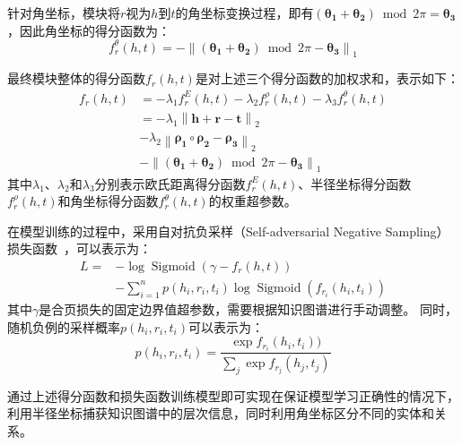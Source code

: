 \documentclass[algorithmlist, AutoFakeBold, AutoFakeSlant, figurelist, tablelist, nomlist, engineering]{seuthesix}
\begin{document}
针对角坐标，模块将$r$视为$h$到$t$的角坐标变换过程，即有$(\bm{\theta_1} + \bm{\theta_2}) \bmod 2 \pi = \bm{\theta_3}$，因此角坐标的得分函数为：
\begin{equation}
  f^{\theta}_r\left(h, t\right) =-\left\|\left(\bm{\theta_1}+\bm{\theta_2}\right) \bmod 2 \pi - \bm{\theta_3}\right\|_1
\end{equation}

最终模块整体的得分函数$f_r(h, t)$是对上述三个得分函数的加权求和，表示如下：
\begin{equation}
  \begin{aligned}
    f_r\left(h, t\right) &= -\lambda_1 f^{E}_r(h, t) -\lambda_2 f^{\rho}_r(h, t) -\lambda_3 f^{\theta}_r(h, t) \\
    &= -\lambda_1 \left\|\bm{h} + \bm{r} - \bm{t}\right\|_2 \\
    &-\lambda_2 \left\|\bm{\rho_1} \circ \bm{\rho_2} - \bm{\rho_3}\right\|_2 \\
    &-\left\|\left(\bm{\theta_1}+\bm{\theta_2}\right) \bmod 2 \pi - \bm{\theta_3}\right\|_1
  \end{aligned}
  \label{f_1}
\end{equation}
其中$\lambda_1$、$\lambda_2$和$\lambda_3$分别表示欧氏距离得分函数$f^E_r(h, t)$、半径坐标得分函数$f^{\rho}_r(h, t)$和角坐标得分函数$f^{\theta}_r(h, t)$的权重超参数。

在模型训练的过程中，采用自对抗负采样（Self-adversarial Negative Sampling）损失函数~\cite{sun2018rotate}，可以表示为：
\begin{equation}
  \begin{aligned}
  L= & -\log \operatorname{Sigmoid}\left(\gamma-f_r(h, t)\right) \\
  & -\sum_{i=1}^n p\left(h_i, r_i, t_i\right) \log \operatorname{Sigmoid}(f_{r_i}(h_i, t_i))
  \end{aligned}
  \label{loss_1}
\end{equation}
其中$\gamma$是合页损失的固定边界值超参数，需要根据知识图谱进行手动调整。
同时，随机负例的采样概率$p(h_i, r_i, t_i)$可以表示为：
\begin{equation}
  p(h_i, r_i, t_i)=\frac{\exp f_{r_i}(h_i, t_i))}{\sum_j \exp f_{r_j}(h_j, t_j)}
\end{equation}

通过上述得分函数和损失函数训练模型即可实现在保证模型学习正确性的情况下，利用半径坐标捕获知识图谱中的层次信息，同时利用角坐标区分不同的实体和关系。

\end{document}
